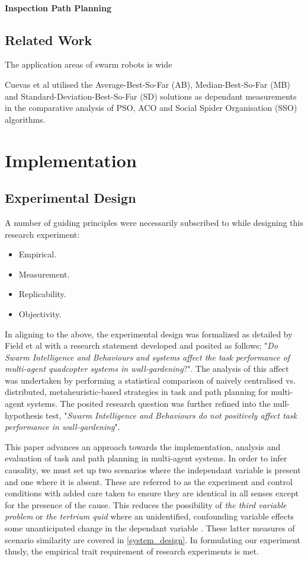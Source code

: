 \documentclass{report}
\begin{document}
\subsubsection{Inspection Path Planning}

\section{Related Work}
The application areas of swarm robots is wide 

Cuevas et al \cite{Cuevas2013} utilised the Average-Best-So-Far (AB), Median-Best-So-Far (MB) and Standard-Deviation-Best-So-Far (SD) solutions as dependant measurements in the comparative analysis of PSO, ACO and Social Spider Organisation (SSO) algorithms.

\chapter{Implementation} \label{implementation}

\section{Experimental Design}
A number of guiding principles \cite{Field2012} were necessarily subscribed to while designing this research experiment:
\begin{itemize}
	\item Empirical.
	\item Measurement.
	\item Replicability.
	\item Objectivity.
\end{itemize}

In aligning to the above, the experimental design was formalized as detailed by Field et al \cite{Field2012} with a research statement developed and posited as follows; "\textit{Do Swarm Intelligence and Behaviours and systems affect the task performance of multi-agent quadcopter systems in wall-gardening}?". The analysis of this affect was undertaken by performing a statistical comparison of naively centralised vs. distributed, metaheuristic-based strategies in task and path planning for multi-agent systems. The posited research question was further refined into the null-hypothesis test, "\textit{Swarm Intelligence and Behaviours do not positively affect task performance in wall-gardening}".

This paper advances an approach towards the implementation, analysis and evaluation of task and path planning in multi-agent systems. In order to infer causality, we must set up two scenarios where the independant variable is present and one where it is absent. These are referred to as the experiment and control conditions with added care taken to ensure they are identical in all senses except for the presence of the cause. This reduces the possibility of \textit{the third variable problem} or \textit{the tertrium quid} where an unidentified, confounding variable effects some unanticipated change in the dependant variable \cite{Field2012}. These latter measures of scenario similarity are covered in \ref{system_design}. In formulating our experiment thusly, the empirical trait requirement of research experiments is met.
\end{document}
